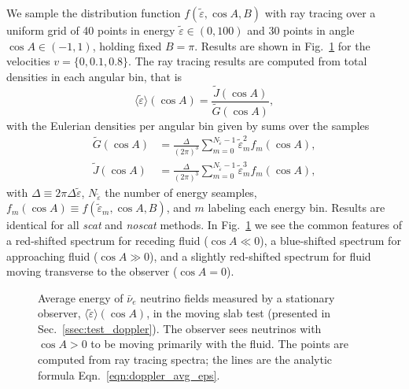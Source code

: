 \documentclass[aps,floatfix,prd,superscriptaddress,twocolumn]{revtex4-1}
\begin{document}
We sample the distribution function $f(\tilde{\varepsilon},\cos A,B)$
with ray tracing
over a uniform grid of 40 points in energy $\tilde{\varepsilon}\in(0,100)$
and 30 points in angle $\cos A\in(-1,1)$, holding fixed $B=\pi$.
Results are shown in Fig.~\ref{fig:avg_eps_doppler} for
the velocities $v=\{0,0.1,0.8\}$.
The ray tracing results are computed from total densities in each angular bin,
that is
\begin{equation}
  \label{eqn:avg_eps_per_cosA}
  \langle \tilde{\varepsilon} \rangle (\cos A) =
  \frac{\tilde{J}(\cos A)}{\tilde{G}(\cos A)},
\end{equation}
with the Eulerian densities per angular bin given by sums over the samples
\begin{align}
  \label{eqn:G_per_cosA}
  \tilde{G}(\cos A) &=
  \frac{\Delta}{(2\pi)^3} \sum\limits_{m=0}^{N_{\tilde{\varepsilon}}-1}\tilde{\varepsilon}_m^2 f_m(\cos A),\\
  \label{eqn:J_per_cosA}
  \tilde{J}(\cos A) &=
  \frac{\Delta}{(2\pi)^3} \sum\limits_{m=0}^{N_{\tilde{\varepsilon}}-1}\tilde{\varepsilon}_m^3 f_m(\cos A),
\end{align}
with $\Delta \equiv 2\pi \Delta\tilde{\varepsilon}$,
$N_{\tilde{\varepsilon}}$ the number of energy seamples,
$f_m(\cos A) \equiv f(\tilde{\varepsilon}_m,\cos A,B)$,
and $m$ labeling each energy bin.
Results are identical for all \emph{scat} and \emph{noscat} methods.
In Fig.~\ref{fig:avg_eps_doppler}
we see the common features of a red-shifted spectrum for receding fluid
($\cos A\ll0$),
a blue-shifted spectrum for approaching fluid
($\cos A\gg0$),
and a slightly red-shifted spectrum for fluid moving transverse to the
observer ($\cos A=0$).

\begin{figure}
  \resizebox{\columnwidth}{!}{}
  \caption{Average energy of $\bar{\nu}_e$ neutrino fields
    measured by a stationary observer,
    $\langle\tilde{\varepsilon}\rangle(\cos A)$,
    in the moving slab test (presented in Sec.~\ref{ssec:test_doppler}).
    The observer sees neutrinos with $\cos A>0$ to be moving primarily with
    the fluid.
    The points are computed from ray tracing spectra; the lines are the
    analytic formula Eqn.~\ref{eqn:doppler_avg_eps}.
  }
  \label{fig:avg_eps_doppler}
\end{figure}
\end{document}
